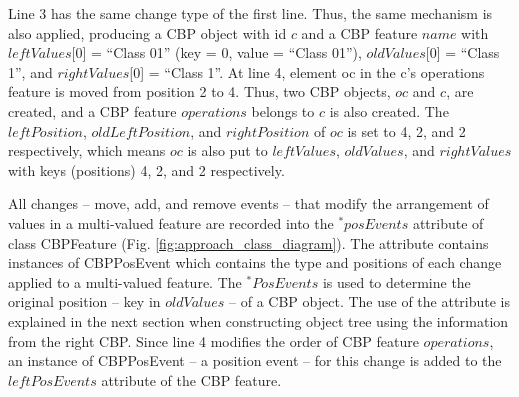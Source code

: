 \documentclass{llncs}
\begin{document}
Line 3 has the same change type of the first line. Thus, the same mechanism is also applied, producing a CBP object with id $c$ and a CBP feature $name$ with $leftValues$[0] = ``Class 01'' (key = 0, value = ``Class 01''), $oldValues$[0] = ``Class 1'', and $rightValues$[0] = ``Class 1''. At line 4, element \textsf{oc} in the \textsf{c}'s \textsf{operations} feature is moved from position 2 to 4. Thus, two CBP objects, $oc$ and $c$, are created, and a CBP feature $operations$ belongs to $c$ is also created. The $leftPosition$, $oldLeftPosition$, and $rightPosition$ of $oc$ is set to 4, 2, and 2 respectively, which means $oc$ is also put to $leftValues$, $oldValues$, and $rightValues$ with keys (positions) 4, 2, and 2 respectively. 

All changes -- move, add, and remove events -- that modify the arrangement of values in a multi-valued feature are recorded into the $^*posEvents$ attribute of class \textsf{CBPFeature} (Fig. \ref{fig:approach_class_diagram}). The attribute contains instances of \textsf{CBPPosEvent} which contains the type and positions of each change applied to a multi-valued feature. The $^*PosEvents$ is used to determine the original position -- key in $oldValues$ -- of a CBP object. The use of the attribute is explained in the next section when constructing object tree using the information from the right CBP. Since line 4 modifies the order of CBP feature $operations$, an instance of \textsf{CBPPosEvent} -- a position event -- for this change is added to the $leftPosEvents$ attribute of the CBP feature.        
\end{document}
